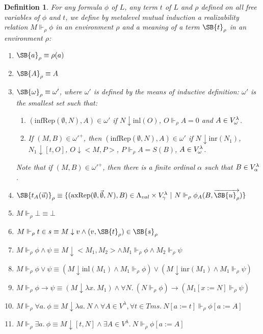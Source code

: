 \documentclass{LMCS}
\newtheorem{definition}[thm]{Definition}
\newcommand\reals{\ensuremath{\Vdash}}
\newcommand{\rrho}{\reals_\rho}
\newcommand{\pl}[1]{\ensuremath{\mathrm{#1}}}
\newcommand{\INL}{\pl{inl}}
\newcommand{\INR}{\pl{inr}}
\begin{document}
\begin{definition}
For any formula $\phi$ of $L$, any term $t$ of $L$ and $\rho$ defined on all free variables of
$\phi$ and $t$, we define by metalevel mutual induction a realizability relation $M
\reals_\rho \phi$ in an environment $\rho$ and a meaning of a term  
$\SB{t}_\rho$ in an environment $\rho$:
\begin{enumerate}[(1)]
\item $\SB{a}_\rho \equiv \rho(a)$
\item $\SB{A}_\rho \equiv A$
\item \label{omegadef} $\SB{\omega}_\rho \equiv \omega'$, where $\omega'$ is defined by the means
of inductive definition: $\omega'$ is the smallest set such that:
\begin{enumerate}[$\bullet$]
\item $(\pl{infRep}(\emptyset, N), A) \in \omega'$ if $N \downarrow \INL(O)$, $O \rrho A =
0$ and $A \in V^{\lambda}_\omega$. 
\item If $(M, B) \in \omega'^+$, then $(\pl{infRep}(\emptyset, N), A) \in \omega'$ if $N
\downarrow \INR(N_1)$, $N_1 \downarrow [t, O]$, $O \downarrow <M, P>$, $P
\rrho A = S(B)$, $A \in V^{\lambda}_\omega$. 
\end{enumerate}
Note that if $(M, B) \in \omega'^+$, then there is a finite ordinal $\alpha$
such that $B \in V^{\lambda}_\alpha$.
\item \label{termdef} $\SB{t_A(\vec{u})}_\rho \equiv \{
(\pl{axRep}(\emptyset, \vec{\emptyset}, N),B) \in \Lambda_{val} \times
\vl_\gamma\ |\ N \reals_\rho \phi_A(B, \overrightarrow{\SB{u}_\rho})\}$
\item $M \reals_\rho \bot \equiv \bot$
\item $M \reals_\rho t \in s \equiv M \downarrow v \land (v, \SB{t}_\rho) \in \SB{s}_\rho$
\item $M \reals_\rho \phi \land \psi \equiv M \downarrow <M_1, M_2> \land M_1
\reals_\rho \phi \land M_2 \reals_\rho \psi$
\item $M \reals_\rho \phi \lor \psi \equiv (M \downarrow \INL(M_1) \land M_1
\reals_\rho \phi) \lor (M \downarrow \INR(M_1) \land M_1 \reals_\rho \psi)$
\item $M \reals_\rho \phi \to \psi \equiv (M \downarrow \lambda x.\ M_1) \land
\forall N.\ (N \reals_\rho \phi) \to (M_1[x:=N] \reals_\rho \psi)$
\item $M \reals_\rho \forall a.\ \phi \equiv M \downarrow \lambda a.\ N
\land \forall A \in V^\lambda, \forall t \in Tms.\ N[a:=t] \reals_\rho \phi[a:=A]$
\item $M \reals_\rho \exists a.\ \phi \equiv M \downarrow [t, N] \land \exists A \in
V^\lambda.\ N \reals_\rho \phi[a:=A]$
\end{enumerate}
\end{definition}
\end{document}
